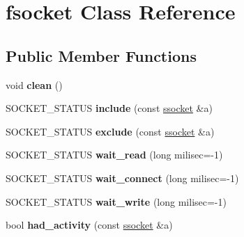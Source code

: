 \hypertarget{classfsocket}{}\section{fsocket Class Reference}
\label{classfsocket}
\subsection*{Public Member Functions}
\begin{DoxyCompactItemize}
\item 
void {\bfseries clean} ()\hypertarget{classfsocket_a0a81f72f6fbbe74cc245a053667299b4}{}\label{classfsocket_a0a81f72f6fbbe74cc245a053667299b4}

\item 
S\+O\+C\+K\+E\+T\+\_\+\+S\+T\+A\+T\+US {\bfseries include} (const \hyperlink{classssocket}{ssocket} \&a)\hypertarget{classfsocket_a16cd7efbd65f4a4c0a32dde3f30b9bdb}{}\label{classfsocket_a16cd7efbd65f4a4c0a32dde3f30b9bdb}

\item 
S\+O\+C\+K\+E\+T\+\_\+\+S\+T\+A\+T\+US {\bfseries exclude} (const \hyperlink{classssocket}{ssocket} \&a)\hypertarget{classfsocket_a197774f3b1321e8379b7aa278a7cc2ec}{}\label{classfsocket_a197774f3b1321e8379b7aa278a7cc2ec}

\item 
S\+O\+C\+K\+E\+T\+\_\+\+S\+T\+A\+T\+US {\bfseries wait\+\_\+read} (long milisec=-\/1)\hypertarget{classfsocket_a1ee2c6b9ebb588ff9992b4c60810a5d1}{}\label{classfsocket_a1ee2c6b9ebb588ff9992b4c60810a5d1}

\item 
S\+O\+C\+K\+E\+T\+\_\+\+S\+T\+A\+T\+US {\bfseries wait\+\_\+connect} (long milisec=-\/1)\hypertarget{classfsocket_adb898914795b0f27f2af52b0ee310423}{}\label{classfsocket_adb898914795b0f27f2af52b0ee310423}

\item 
S\+O\+C\+K\+E\+T\+\_\+\+S\+T\+A\+T\+US {\bfseries wait\+\_\+write} (long milisec=-\/1)\hypertarget{classfsocket_afe740e23eca71722000157cb6f0e8162}{}\label{classfsocket_afe740e23eca71722000157cb6f0e8162}

\item 
bool {\bfseries had\+\_\+activity} (const \hyperlink{classssocket}{ssocket} \&a)\hypertarget{classfsocket_af59c2a4b61d04877ccc8e06b1b43ddc8}{}\label{classfsocket_af59c2a4b61d04877ccc8e06b1b43ddc8}

\end{DoxyCompactItemize}
